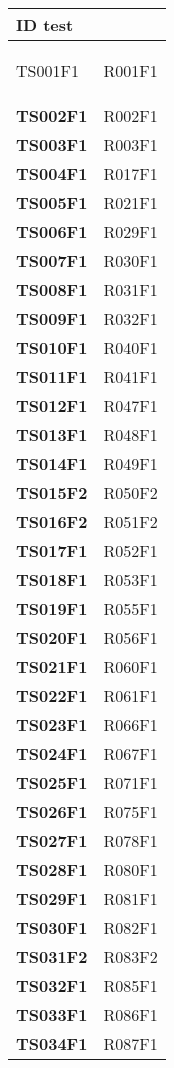 \documentclass[../piano-di-qualifica.tex]{subfiles}
\begin{document}

\renewcommand{\arraystretch}{2} %
\begin{longtable}[H]{>{\centering\bfseries}m{5cm} >{\centering\arraybackslash}m{5cm}}
  \rowcolor{darkgray!90!}
  \color{white}
  {\textbf{ID test}} & \color{white}{\textbf{Requisito}} \\
  \endhead\rowcolor{white}%

  \endfoot%
  \endlastfoot%
  TS001F1 & R001F1 \\
  TS002F1 & R002F1 \\
  TS003F1 & R003F1 \\
  TS004F1 & R017F1 \\
  TS005F1 & R021F1 \\
  TS006F1 & R029F1 \\
  TS007F1 & R030F1 \\
  TS008F1 & R031F1 \\
  TS009F1 & R032F1 \\
  TS010F1 & R040F1 \\
  TS011F1 & R041F1 \\
  TS012F1 & R047F1 \\
  TS013F1 & R048F1 \\
  TS014F1 & R049F1 \\
  TS015F2 & R050F2 \\
  TS016F2 & R051F2 \\
  TS017F1 & R052F1 \\
  TS018F1 & R053F1 \\
  TS019F1 & R055F1 \\
  TS020F1 & R056F1 \\
  TS021F1 & R060F1 \\
  TS022F1 & R061F1 \\
  TS023F1 & R066F1 \\
  TS024F1 & R067F1 \\
  TS025F1 & R071F1 \\
  TS026F1 & R075F1 \\
  TS027F1 & R078F1 \\
  TS028F1 & R080F1 \\
  TS029F1 & R081F1 \\
  TS030F1 & R082F1 \\
  TS031F2 & R083F2 \\
  TS032F1 & R085F1 \\
  TS033F1 & R086F1 \\
  TS034F1 & R087F1 \\

\end{longtable}
\end{document}
